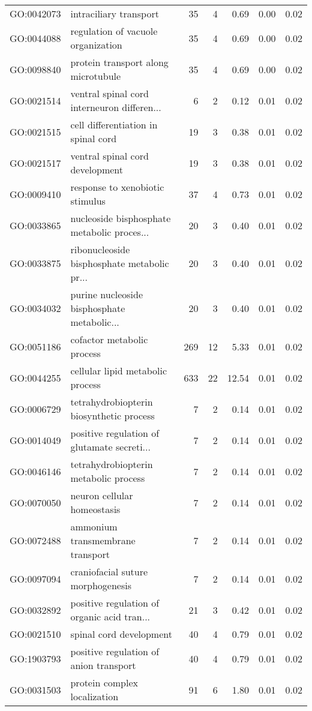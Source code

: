 \begin{table}[ht]
\begin{tabular}{llrrrrr}
  GO:0042073 & intraciliary transport &  35 &   4 & 0.69 & 0.00 & 0.02 \\ 
  GO:0044088 & regulation of vacuole organization &  35 &   4 & 0.69 & 0.00 & 0.02 \\ 
  GO:0098840 & protein transport along microtubule &  35 &   4 & 0.69 & 0.00 & 0.02 \\ 
  GO:0021514 & ventral spinal cord interneuron differen... &   6 &   2 & 0.12 & 0.01 & 0.02 \\ 
  GO:0021515 & cell differentiation in spinal cord &  19 &   3 & 0.38 & 0.01 & 0.02 \\ 
  GO:0021517 & ventral spinal cord development &  19 &   3 & 0.38 & 0.01 & 0.02 \\ 
  GO:0009410 & response to xenobiotic stimulus &  37 &   4 & 0.73 & 0.01 & 0.02 \\ 
  GO:0033865 & nucleoside bisphosphate metabolic proces... &  20 &   3 & 0.40 & 0.01 & 0.02 \\ 
  GO:0033875 & ribonucleoside bisphosphate metabolic pr... &  20 &   3 & 0.40 & 0.01 & 0.02 \\ 
  GO:0034032 & purine nucleoside bisphosphate metabolic... &  20 &   3 & 0.40 & 0.01 & 0.02 \\ 
  GO:0051186 & cofactor metabolic process & 269 &  12 & 5.33 & 0.01 & 0.02 \\ 
  GO:0044255 & cellular lipid metabolic process & 633 &  22 & 12.54 & 0.01 & 0.02 \\ 
  GO:0006729 & tetrahydrobiopterin biosynthetic process &   7 &   2 & 0.14 & 0.01 & 0.02 \\ 
  GO:0014049 & positive regulation of glutamate secreti... &   7 &   2 & 0.14 & 0.01 & 0.02 \\ 
  GO:0046146 & tetrahydrobiopterin metabolic process &   7 &   2 & 0.14 & 0.01 & 0.02 \\ 
  GO:0070050 & neuron cellular homeostasis &   7 &   2 & 0.14 & 0.01 & 0.02 \\ 
  GO:0072488 & ammonium transmembrane transport &   7 &   2 & 0.14 & 0.01 & 0.02 \\ 
  GO:0097094 & craniofacial suture morphogenesis &   7 &   2 & 0.14 & 0.01 & 0.02 \\ 
  GO:0032892 & positive regulation of organic acid tran... &  21 &   3 & 0.42 & 0.01 & 0.02 \\ 
  GO:0021510 & spinal cord development &  40 &   4 & 0.79 & 0.01 & 0.02 \\ 
  GO:1903793 & positive regulation of anion transport &  40 &   4 & 0.79 & 0.01 & 0.02 \\ 
  GO:0031503 & protein complex localization &  91 &   6 & 1.80 & 0.01 & 0.02 \\ 
   \hline
\end{tabular}
\end{table}
